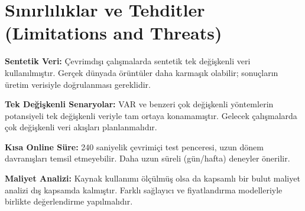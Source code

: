 \section{Sınırlılıklar ve Tehditler (Limitations and Threats)}

\textbf{Sentetik Veri:} Çevrimdışı çalışmalarda sentetik tek değişkenli veri kullanılmıştır. Gerçek dünyada örüntüler daha karmaşık olabilir; sonuçların üretim verisiyle doğrulanması gereklidir.

\textbf{Tek Değişkenli Senaryolar:} VAR ve benzeri çok değişkenli yöntemlerin potansiyeli tek değişkenli veriyle tam ortaya konamamıştır. Gelecek çalışmalarda çok değişkenli veri akışları planlanmalıdır.

\textbf{Kısa Online Süre:} 240 saniyelik çevrimiçi test penceresi, uzun dönem davranışları temsil etmeyebilir. Daha uzun süreli (gün/hafta) deneyler önerilir.

\textbf{Maliyet Analizi:} Kaynak kullanımı ölçülmüş olsa da kapsamlı bir bulut maliyet analizi dış kapsamda kalmıştır. Farklı sağlayıcı ve fiyatlandırma modelleriyle birlikte değerlendirme yapılmalıdır.

